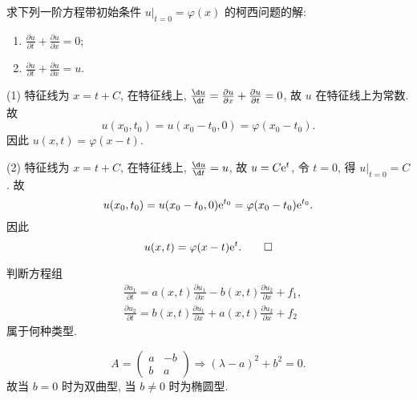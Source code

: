 \begin{exercise}
  求下列一阶方程带初始条件 $u|_{t=0} = \varphi(x)$ 的柯西问题的解:
  \begin{enumerate}[(1)]
    \item $\displaystyle\frac{\partial u}{\partial t} + \frac{\partial u}{\partial x} = 0$;
    \item $\displaystyle\frac{\partial u}{\partial t} + \frac{\partial u}{\partial x} = u$.
  \end{enumerate}
\end{exercise}

\begin{solve}
  (1) 特征线为 $x = t+C$, 在特征线上, $\frac{\d u}{\d t} = 
    \frac{\partial u}{\partial x} + \frac{\partial u}{\partial t} = 0$,
  故 $u$ 在特征线上为常数. 故
  \[u(x_0, t_0) = u(x_0-t_0, 0) = \varphi(x_0-t_0).\]
  因此 $u(x,t) = \varphi(x-t)$.

  (2) 特征线为 $x = t+C$, 在特征线上, $\frac{\d u}{\d t} = u$,
  故 $u = C\mathrm{e}^t$, 令 $t=0$, 得 $u|_{t=0} = C$. 故
  \[u(x_0, t_0) = u(x_0-t_0, 0) \mathrm{e}^{t_0} = \varphi(x_0-t_0)\mathrm{e}^{t_0}.\]
  因此
  \[u(x, t) = \varphi(x-t) \mathrm{e}^t. \qedhere\]
\end{solve}


\begin{exercise}
  判断方程组
  \begin{align*}
    & \frac{\partial u_1}{\partial t} = a(x,t) \frac{\partial u_1}{\partial x}
      - b(x,t) \frac{\partial u_2}{\partial x} + f_1, \\
    & \frac{\partial u_2}{\partial t} = b(x,t) \frac{\partial u_1}{\partial x}
      + a(x,t) \frac{\partial u_2}{\partial x} + f_2
  \end{align*}
  属于何种类型.
\end{exercise}

\begin{solve}
  \[A = \begin{pmatrix}
    a & -b \\
    b & a
  \end{pmatrix} \Rightarrow (\lambda-a)^2+b^2 = 0.\]
  故当 $b=0$ 时为双曲型, 当 $b\neq 0$ 时为椭圆型.
\end{solve}


